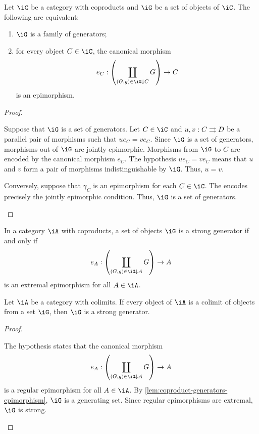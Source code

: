 \documentclass{zett}
\begin{document}
\begin{lem}\label{lem:coproduct-generators-epimorphism}
  Let $\iC$ be a category with coproducts and $\iG$ be a set of objects of $\iC$.
  The following are equivalent:
  \begin{enumerate}
  \item $\iG$ is a family of generators;
  \item for every object $C \in \iC$, the canonical morphism
    \[
      e_{C} : \left(\coprod_{(G, g) \in \iG \dn C} G\right) \to C
    \]
    is an epimorphism.
  \end{enumerate}
\end{lem}
\begin{proof}
  \begin{node}
    Suppose that $\iG$ is a set of generators.
    Let $C \in \iC$ and $u, v : C \rightrightarrows D$ be a parallel pair of morphisms such that $ue_{C} = ve_{C}$.
    Since $\iG$ is a set of generators, morphisms out of $\iG$ are jointly epimorphic.
    Morphisms from $\iG$ to $C$ are encoded by the canonical morphism $e_{C}$.
    The hypothesis $ue_{C} = ve_{C}$ means that $u$ and $v$ form a pair of morphisms indistinguishable by $\iG$.
    Thus, $u = v$.
  \end{node}
  \begin{node}
    Conversely, suppose that $\gamma_{C}$ is an epimorphism for each $C \in \iC$.
    The encodes precisely the jointly epimorphic condition.
    Thus, $\iG$ is a set of generators.
  \end{node}
\end{proof}

\begin{defn}
  In a category $\iA$ with coproducts, a set of objects $\iG$ is a strong generator if and only if
  \[
    e_{A} : \left(\coprod_{(G, g) \in \iG \dn A} G\right) \to A
  \]
  is an extremal epimorphism for all $A \in \iA$.
\end{defn}

\begin{cor}\label{cor:colimits-strong-generators}
  Let $\iA$ be a category with colimits.
  If every object of $\iA$ is a colimit of objects from a set $\iG$, then $\iG$ is a strong generator.
\end{cor}
\begin{proof}
  \begin{node}
    The hypothesis states that the canonical morphism
    \[
      e_{A} : \left(\coprod_{(G, g) \in \iG \dn A} G\right) \to A
    \]
    is a regular epimorphism for all $A \in \iA$.
    By \cref{lem:coproduct-generators-epimorphism}, $\iG$ is a generating set.
    Since regular epimorphisms are extremal, $\iG$ is strong.
  \end{node}
\end{proof}
\end{document}
